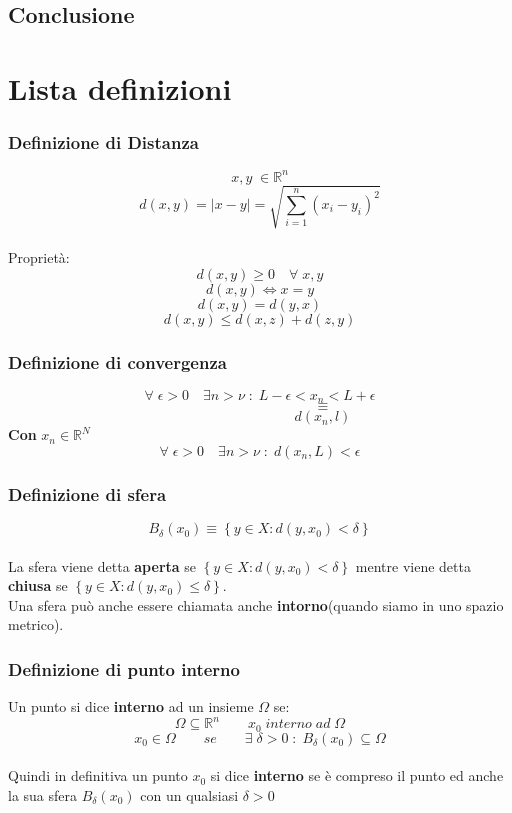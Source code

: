 \documentclass[fontsize = 20px, paper = a4]{article}
\begin{document}
\subsection{Conclusione}
\section{Lista definizioni}
\subsubsection{Definizione di Distanza}
\hspace*{1cm}
$$x,y \; \in \mathbb{R}^n$$
$$d(x,y) = |x-y| = \sqrt{\sum_{i = 1}^{n}(x_i - y_i)^2} $$ \\ 
Proprietà:
$$d(x,y) \ge 0 \quad \forall \; x,y$$
$$d(x,y) \Leftrightarrow x = y$$
$$d(x,y) = d(y,x) $$
$$d(x,y) \le d(x,z) + d(z,y)$$
\subsubsection{Definizione di convergenza}
\hspace*{1cm}
$$\forall \; \epsilon > 0 \quad \exists n > \nu \; : \; L - \epsilon < x_n < L+\epsilon$$
$$\quad\quad\quad\quad\quad\quad\quad\quad\quad \equiv$$
$$\quad\quad\quad\quad\quad\quad\quad\quad\quad d(x_n,l)$$
\textbf{Con} $x_n \in \mathbb{R}^N$
$$\forall \; \epsilon > 0 \quad \exists n > \nu \; : \; d(x_n,L) < \epsilon$$
 
\subsubsection{Definizione di sfera}
\hspace*{1cm}
$$B_\delta \left(x_0 \right) \equiv \left\{ y\in X : d \left( y,x_0\right )  < \delta  \right\}$$  \\
La sfera viene detta \textbf{aperta} se $\left\{ y\in X : d \left( y,x_0\right )  < \delta \right\}$ mentre viene detta \textbf{chiusa} se $\left\{ y\in X : d \left( y,x_0  \right ) \le \delta \right\}$.\\
Una sfera può anche essere  chiamata anche \textbf{intorno}(quando siamo in uno spazio metrico).
\subsubsection{Definizione di punto interno}
Un punto si dice \textbf{interno} ad un insieme $\Omega$ se: \\
$$\Omega \subseteq \mathbb{R}^n \qquad x_0 \; interno \; ad \; \Omega$$
$$x_0 \in \Omega \qquad se \qquad \exists \; \delta > 0 \; : \; B_\delta(x_0) \subseteq \Omega$$ \\
Quindi in definitiva un punto $x_0$ si dice \textbf{interno} se è compreso il punto ed anche la sua sfera $B_\delta(x_0)$ con un qualsiasi $\delta > 0$
\end{document}
